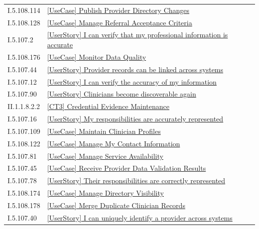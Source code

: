 \begin{longtable}{p{.22\linewidth}p{.73\linewidth}}
I.5.108.114 & \hyperref[element:e0711711cba449788b17e5276db264f9]{[UseCase] Publish Provider Directory Changes} \\
I.5.108.128 & \hyperref[element:e14063da0e9a42a399014d6b44a19275]{[UseCase] Manage Referral Acceptance Criteria} \\
I.5.107.2 & \hyperref[element:e310e52bcb8045799887b5abfdfb5d14]{[UserStory] I can verify that my professional information is accurate} \\
I.5.108.176 & \hyperref[element:e47331f9fe7e41d78ea37b188cdf8aa4]{[UseCase] Monitor Data Quality} \\
I.5.107.44 & \hyperref[element:e69c17947c3b4861b508d9d18e53dec0]{[UserStory] Provider records can be linked across systems} \\
I.5.107.12 & \hyperref[element:ea9ded05d14f4268978cbe0f06a08963]{[UserStory] I can verify the accuracy of my information} \\
I.5.107.90 & \hyperref[element:eb0a67988bf3487f98777363ad7ebd6b]{[UserStory] Clinicians become discoverable again} \\
II.1.1.8.2.2 & \hyperref[element:ece496e1dc7e4a319318ef6811dfece7]{[CT3] Credential Evidence Maintenance} \\
I.5.107.16 & \hyperref[element:ecf21aebc08b4dc2a91cdf71d341e3aa]{[UserStory] My responsibilities are accurately represented} \\
I.5.107.109 & \hyperref[element:ee13dd7954ba49c3a63c6760e3205d5c]{[UseCase] Maintain Clinician Profiles} \\
I.5.108.122 & \hyperref[element:eefd94f571e74635b60241a0903e2f58]{[UseCase] Manage My Contact Information} \\
I.5.107.81 & \hyperref[element:ef2a42e52a834c4db8265225157f273d]{[UseCase] Manage Service Availability} \\
I.5.107.45 & \hyperref[element:f10e2597ef384c7ba1998d6e9789d282]{[UseCase] Receive Provider Data Validation Results} \\
I.5.107.78 & \hyperref[element:f330bfd85fca44b1a78f013119875e8d]{[UserStory] Their responsibilities are correctly represented} \\
I.5.108.174 & \hyperref[element:f53e910961ee4a8798e93bdc77cb0961]{[UseCase] Manage Directory Visibility} \\
I.5.108.178 & \hyperref[element:f827f1c9a7b3438eadd3599bac48f2c3]{[UseCase] Merge Duplicate Clinician Records} \\
I.5.107.40 & \hyperref[element:f976289439784adcbd53112231d99cc7]{[UserStory] I can uniquely identify a provider across systems} \\

\end{longtable}
